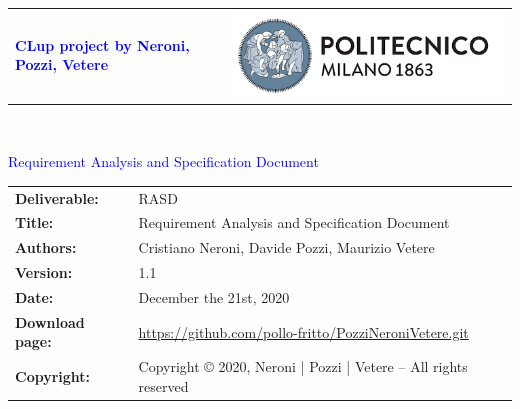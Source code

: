 


\sffamily
    
    
    \begin{titlepage}
        

        
        {\begin{table}[t!]
                \centering
                \begin{tabu} to \textwidth { X[1.3,r,p] X[1.7,l,p] }
                    \textcolor{Blue}
                    {\textbf{\small{\textsf{CLup project by Neroni, Pozzi, Vetere}}}} & \includegraphics[scale=0.4]{Images/PolimiLogo}
                \end{tabu}
            \end{table}}~\\ [7cm]
        
        \begin{flushleft}
             
            {\textcolor{blue}{\textrm{\Huge{Requirement Analysis and Specification Document}}}} \\ [1cm]
            
        \end{flushleft}
        
    \end{titlepage}
    
    \begin{table}[h!]
    \sffamily
        \begin{tabu} to \textwidth { X[0.3,r,p] X[0.7,l,p] }
            \hline
            \textbf{Deliverable:} & RASD\\
            \textbf{Title:} & Requirement Analysis and Specification Document \\
            \textbf{Authors:} & Cristiano Neroni, Davide Pozzi, Maurizio Vetere \\
            \textbf{Version:} & 1.1 \\ 
            \textbf{Date:} & December the 21st, 2020 \\
            \textbf{Download page:} & \small \url{https://github.com/pollo-fritto/PozziNeroniVetere.git} \\
            \textbf{Copyright:} & Copyright © 2020, Neroni | Pozzi | Vetere – All rights reserved \\
            \hline
        \end{tabu}
    \end{table}
    
